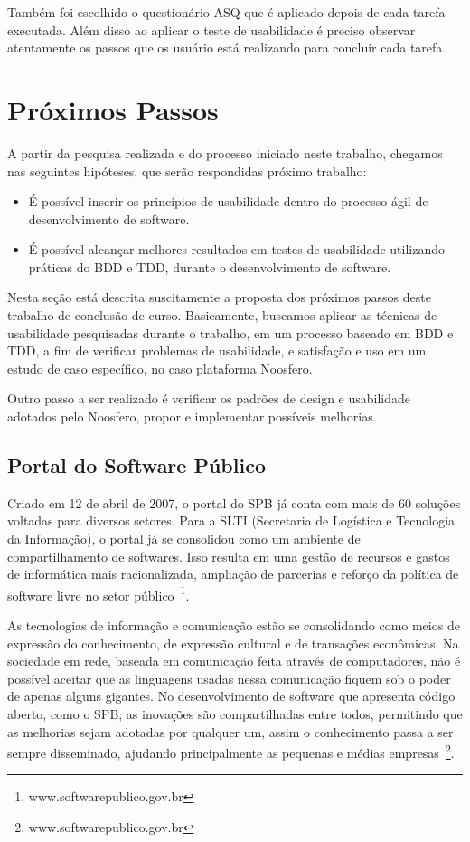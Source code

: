 	Também foi escolhido o questionário ASQ que é aplicado depois de cada tarefa executada. Além disso ao aplicar o teste de usabilidade é preciso observar atentamente os passos que os usuário está realizando para concluir cada tarefa.

\section{Próximos Passos}

A partir da pesquisa realizada e do processo iniciado neste trabalho, chegamos nas seguintes hipóteses, que serão respondidas próximo trabalho: 
\begin{itemize}
\item É possível inserir os princípios de usabilidade dentro do processo ágil de desenvolvimento de software.
\item É possível alcançar melhores resultados em testes de usabilidade utilizando práticas do BDD e TDD, durante o desenvolvimento de software.
\end{itemize}

Nesta seção está descrita suscitamente a proposta dos próximos passos deste trabalho de conclusão de curso. Basicamente, buscamos aplicar as técnicas de usabilidade pesquisadas durante o trabalho, em um processo baseado em BDD e TDD, a fim de verificar problemas de usabilidade, e satisfação e uso em um estudo de caso específico, no caso plataforma Noosfero. 

Outro passo a ser realizado é verificar os padrões de design e usabilidade adotados pelo Noosfero, propor  e implementar possíveis melhorias.

\subsection{Portal do Software Público}

Criado em 12 de abril de 2007, o portal do SPB já conta com mais de 60 soluções voltadas para diversos setores. Para a SLTI (Secretaria de Logística e Tecnologia da Informação), o portal já se consolidou como um ambiente de compartilhamento de softwares. Isso resulta em uma gestão de recursos e gastos de informática mais racionalizada, ampliação de parcerias e reforço da política de software livre no setor público~\footnote{www.softwarepublico.gov.br}. 

As tecnologias de informação e comunicação estão se consolidando como meios de expressão do conhecimento, de expressão cultural e de transações econômicas. Na sociedade em rede, baseada em comunicação feita através de computadores, não é possível aceitar que as linguagens usadas nessa comunicação fiquem sob o poder de apenas alguns gigantes. No desenvolvimento de software que apresenta código aberto, como o SPB, as inovações são compartilhadas entre todos, permitindo que as melhorias sejam adotadas por qualquer um, assim o conhecimento passa a ser sempre disseminado, ajudando principalmente as pequenas e médias empresas~\footnote{www.softwarepublico.gov.br}.

